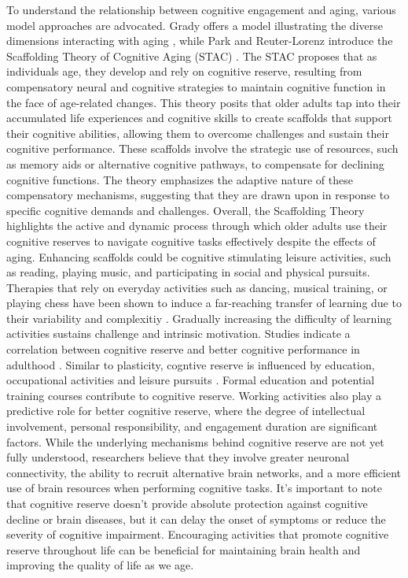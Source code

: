 To understand the relationship between cognitive engagement and aging, various model approaches are advocated. Grady offers a model illustrating the diverse dimensions interacting with aging \cite{Grady2012}, while Park and Reuter-Lorenz introduce the Scaffolding Theory of Cognitive Aging (STAC) \cite{Park2009}. The STAC proposes that as individuals age, they develop and rely on cognitive reserve, resulting from compensatory neural and cognitive strategies to maintain cognitive function in the face of age-related changes. This theory posits that older adults tap into their accumulated life experiences and cognitive skills to create scaffolds that support their cognitive abilities, allowing them to overcome challenges and sustain their cognitive performance. These scaffolds involve the strategic use of resources, such as memory aids or alternative cognitive pathways, to compensate for declining cognitive functions. The theory emphasizes the adaptive nature of these compensatory mechanisms, suggesting that they are drawn upon in response to specific cognitive demands and challenges. Overall, the Scaffolding Theory highlights the active and dynamic process through which older adults use their cognitive reserves to navigate cognitive tasks effectively despite the effects of aging. Enhancing scaffolds could be cognitive stimulating leisure activities, such as reading, playing music, and participating in social and physical pursuits. Therapies that rely on everyday activities such as dancing, musical training, or playing chess have been shown to induce a far-reaching transfer of learning due to their variability and complexitiy \cite{Shawn2008, Shawn2014}. Gradually increasing the difficulty of learning activities sustains challenge and intrinsic motivation. Studies indicate a correlation between cognitive reserve and better cognitive performance in adulthood \cite{Panico2022}.
Similar to plasticity, cogntive reserve is influenced by education, occupational activities and leisure pursuits \cite{Nucci2012}. Formal education and potential training courses contribute to cognitive reserve. Working activities also play a predictive role for better cognitive reserve, where the degree of intellectual involvement, personal responsibility, and engagement duration are significant factors. 
While the underlying mechanisms behind cognitive reserve are not yet fully understood, researchers believe that they involve greater neuronal connectivity, the ability to recruit alternative brain networks, and a more efficient use of brain resources when performing cognitive tasks. It's important to note that cognitive reserve doesn't provide absolute protection against cognitive decline or brain diseases, but it can delay the onset of symptoms or reduce the severity of cognitive impairment. Encouraging activities that promote cognitive reserve throughout life can be beneficial for maintaining brain health and improving the quality of life as we age.

